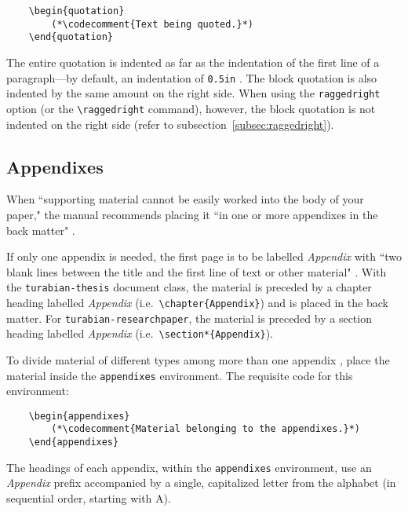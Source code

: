 \documentclass{article}
\newcommand{\codecomment}[1]{\textrm{$\langle$\emph{#1}$\rangle$}}
\newcommand{\textcmd}[1]{\texttt{\textbackslash #1}}
\begin{document}
\begin{lstlisting}
	\begin{quotation}
		(*\codecomment{Text being quoted.}*)
	\end{quotation}
\end{lstlisting}

The entire quotation is indented as far as the indentation of the first line of a paragraph---by default, an indentation of \texttt{0.5in} \autocite[349]{turabian_manual_2013}. The block quotation is also indented by the same amount on the right side. When using the \texttt{raggedright} option (or the \textcmd{raggedright} command), however, the block quotation is not indented on the right side (refer to subsection~\ref{subsec:raggedright}).


\subsection{Appendixes}
\label{subsec:appendixes}

When ``supporting material cannot be easily worked into the body of your paper," the manual recommends placing it ``in one or more appendixes in the back matter" \autocite[398]{turabian_manual_2013}.

If only one appendix is needed, the first page is to be labelled \emph{Appendix} with ``two blank lines between the title and the first line of text or other material" \autocite[398]{turabian_manual_2013}. With the \texttt{turabian-thesis} document class, the material is preceded by a chapter heading labelled \emph{Appendix} (i.e.~\texttt{\textcmd{chapter}\{Appendix\}}) and is placed in the back matter. For \texttt{turabian-researchpaper}, the material is preceded by a section heading labelled \emph{Appendix} (i.e.~\texttt{\textcmd{section*}\{Appendix\}}).

To divide material of different types among more than one appendix \autocite[398]{turabian_manual_2013}, place the material inside the \texttt{appendixes} environment. The requisite code for this environment:

\begin{lstlisting}
	\begin{appendixes}
		(*\codecomment{Material belonging to the appendixes.}*)
	\end{appendixes}
\end{lstlisting}

The headings of each appendix, within the \texttt{appendixes} environment, use an \emph{Appendix} prefix accompanied by a single, capitalized letter from the alphabet (in sequential order, starting with A).
\end{document}
